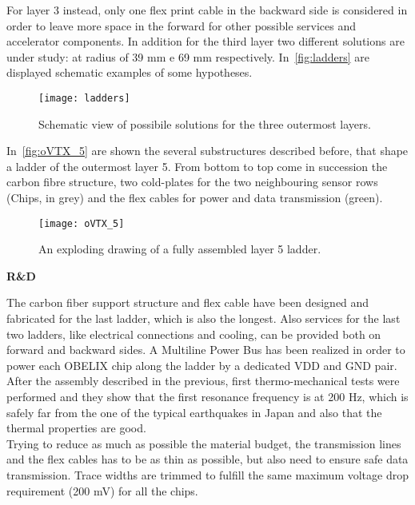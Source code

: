 For layer 3 instead, only one flex print cable in the backward side is considered in order to leave more space in the forward for other possible services and accelerator components. In addition for the third layer two different solutions are under study: at radius of 39 mm e 69 mm respectively. 
In~\autoref{fig:ladders} are displayed schematic examples of some hypotheses. 

\begin{figure}[h!]
\centering
\texttt{[image: ladders]}
\caption{Schematic view of possibile solutions for the three outermost layers.}
\label{fig:ladders}
\end{figure}


In~\autoref{fig:oVTX_5} are shown the several substructures described before, that shape a ladder of the outermost layer 5. From bottom to top come in succession the carbon fibre structure, two cold-plates for the two neighbouring sensor rows (Chips, in grey) and the flex cables for power and data transmission (green). 


\begin{figure}[h!]
\centering
\texttt{[image: oVTX\_5]}
\caption{An exploding drawing of a fully assembled layer 5 ladder.}
\label{fig:oVTX_5}
\end{figure}

\begin{description}
\item \textbf{R\&D}
\end{description}

The carbon fiber support structure and flex cable have been designed and fabricated for the last ladder, which is also the longest. Also services for the last two ladders, like electrical connections and cooling, can be provided both on forward and backward sides.
A Multiline Power Bus has been realized in order to power each OBELIX chip along the ladder by a dedicated VDD and GND pair. \\

After the assembly described in the previous, first thermo-mechanical tests were performed and they show that the first resonance frequency is at 200 Hz, which is safely far from the one of the typical earthquakes in Japan and also that the thermal properties are good.\\

Trying to reduce as much as possible the material budget, the transmission lines and the flex cables has to be as thin as possible, but also need to ensure safe data transmission. Trace widths are trimmed to fulfill the same maximum voltage drop requirement (200 mV) for all the chips.

